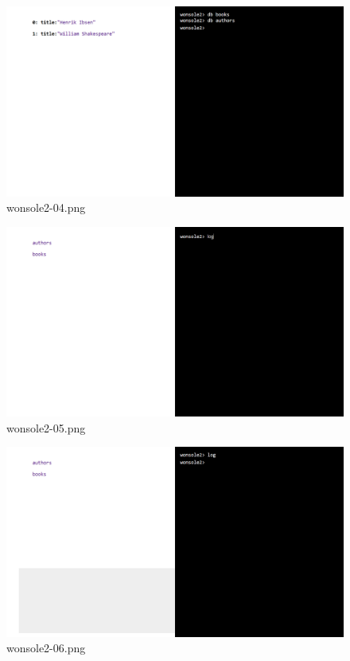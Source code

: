 \begin{figure}
\includegraphics[width=\textwidth]{screenshot/wonsole2/wonsole2-04.png}
\caption{wonsole2-04.png}
\label{wonsole2-04.png}
\end{figure}


\clearpage
\begin{figure}
\includegraphics[width=\textwidth]{screenshot/wonsole2/wonsole2-05.png}
\caption{wonsole2-05.png}
\label{wonsole2-05.png}
\end{figure}


\begin{figure}
\includegraphics[width=\textwidth]{screenshot/wonsole2/wonsole2-06.png}
\caption{wonsole2-06.png}
\label{wonsole2-06.png}
\end{figure}


